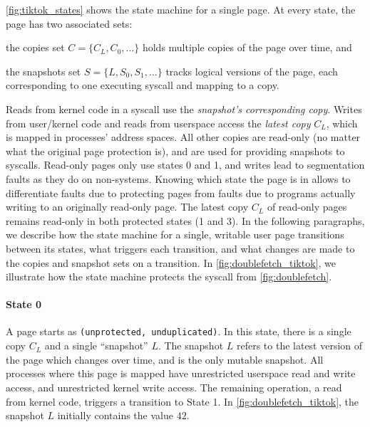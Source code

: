 \documentclass[letterpaper,twocolumn,10pt]{article}
\begin{document}
\autoref{fig:tiktok_states} shows the state machine for a single page.
At every state, the page has two associated sets:
\begin{inparaenum}
  \item the copies set $C = \{C_L, C_0, \dots\}$ holds multiple copies of the page over time, and
  \item the snapshots set $S = \{L, S_0, S_1, \dots\}$ tracks logical versions of the page, each corresponding to one executing syscall and mapping to a copy. 
\end{inparaenum}
Reads from kernel code in a syscall use the \emph{snapshot's corresponding copy}.
Writes from user/kernel code and reads from userspace access the \emph{latest 
copy} $C_L$, which is mapped in processes' address spaces.
All other copies are read-only (no matter what the original page protection is), and are used for providing snapshots to syscalls.
Read-only pages only use states 0 and 1, and writes lead to segmentation faults
as they do on non-\tiktok systems.
Knowing which state the page is in allows \tiktok to differentiate faults due
to protecting pages from faults due to programs actually writing to an 
originally read-only page.
The latest copy $C_L$ of read-only pages remains read-only in both
protected states (1 and 3).
In the following paragraphs, we describe how the state machine for a single, 
writable user page transitions between its states, what triggers each transition, 
and what changes are made to the copies and snapshot sets on a transition.
In \autoref{fig:doublefetch_tiktok}, we illustrate how the state machine protects the 
syscall from \autoref{fig:doublefetch}.

\paragraph{State 0}
A page starts as \texttt{(unprotected, unduplicated)}.
In this state, there is a single copy $C_L$ and a single ``snapshot'' $L$. 
The snapshot $L$ refers to the latest version of the page which changes 
over time, and is the only mutable snapshot.
All processes where this page is mapped have unrestricted userspace read and write 
access, and unrestricted kernel write access.
The remaining operation, a read from kernel code, triggers a transition to 
State 1.
In \autoref{fig:doublefetch_tiktok}, the snapshot $L$ initially contains 
the value $42$.
\end{document}

